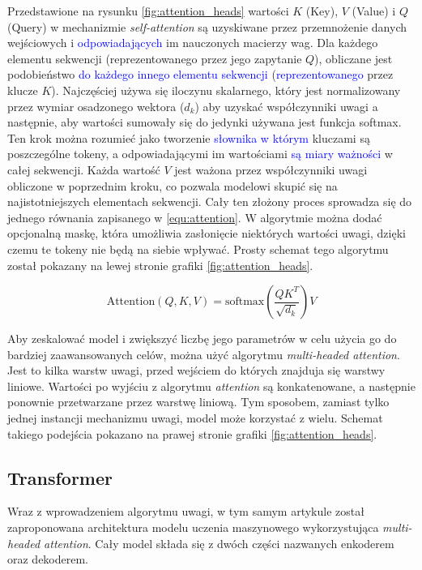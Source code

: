 \documentclass[data-science]{agh-wi} %
\begin{document}
Przedstawione na rysunku \ref*{fig:attention_heads} wartości $K$ (Key), $V$ (Value) i $Q$ (Query) w mechanizmie \textit{self-attention} są uzyskiwane przez przemnożenie danych wejściowych i \textcolor{blue}{odpowiadających} im nauczonych macierzy wag. Dla każdego elementu sekwencji (reprezentowanego przez jego zapytanie $Q$), obliczane jest podobieństwo \textcolor{blue}{do każdego innego elementu sekwencji} (\textcolor{blue}{reprezentowanego} przez klucze $K$). Najczęściej używa się iloczynu skalarnego, który jest normalizowany przez wymiar osadzonego wektora ($d_k$) aby uzyskać współczynniki uwagi a następnie, aby wartości sumowały się do jedynki używana jest funkcja softmax. Ten krok można rozumieć jako tworzenie \textcolor{blue}{słownika w którym} kluczami są poszczególne tokeny, a odpowiadającymi im wartościami \textcolor{blue}{są miary ważności} w całej sekwencji. Każda wartość $V$ jest ważona przez współczynniki uwagi obliczone w poprzednim kroku, co pozwala modelowi skupić się na najistotniejszych elementach sekwencji. Cały ten złożony proces sprowadza się do jednego równania zapisanego w \ref*{equ:attention}. W algorytmie można dodać opcjonalną maskę, która umożliwia zasłonięcie niektórych wartości uwagi, dzięki czemu te tokeny nie będą na siebie wpływać. Prosty schemat tego algorytmu został pokazany na lewej stronie grafiki \ref*{fig:attention_heads}.

\begin{equation}
    \text{Attention}(Q, K, V) = \text{softmax}\left(\dfrac{QK^T}{\sqrt{d_k}}\right)V
    \label{equ:attention}
\end{equation}

Aby zeskalować model i zwiększyć liczbę jego parametrów w celu użycia go do bardziej zaawansowanych celów, można użyć algorytmu \textit{multi-headed attention}. Jest to kilka warstw uwagi, przed wejściem do których znajduja się warstwy liniowe. Wartości po wyjściu z algorytmu \textit{attention} są konkatenowane, a następnie ponownie przetwarzane przez warstwę liniową. Tym sposobem, zamiast tylko jednej instancji mechanizmu uwagi, model może korzystać z wielu. Schemat takiego podejścia pokazano na prawej stronie grafiki \ref*{fig:attention_heads}.

\subsection{Transformer}
Wraz z wprowadzeniem algorytmu uwagi, w tym samym artykule został zaproponowana architektura modelu uczenia maszynowego wykorzystująca \textit{multi-headed attention}. Cały model składa się z dwóch części nazwanych enkoderem oraz dekoderem.
\end{document}
